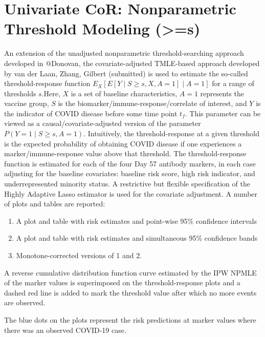 \documentclass[]{article}
\author{}
\date{\vspace{-2.5em}}
\begin{document}
\hypertarget{univariate-cor-nonparametric-threshold-modeling-s}{%
\section{Univariate CoR: Nonparametric Threshold Modeling
(\textgreater{}=s)}\label{univariate-cor-nonparametric-threshold-modeling-s}}

An extension of the unadjusted nonparametric threshold-searching
approach developed in @Donovan, the covariate-adjusted TMLE-based
approach developed by van der Laan, Zhang, Gilbert (submitted) is used
to estimate the so-called threshold-response function
\(E_X[ E[Y \mid S \geq s, X, A = 1] \mid A=1]\) for a range of
thresholds \(s\).Here, \(X\) is a set of baseline characteristics,
\(A=1\) represents the vaccine group, \(S\) is the
biomarker/immune-response/correlate of interest, and \(Y\) is the
indicator of COVID disease before some time point \(t_f\). This
parameter can be viewed as a causal/covariate-adjusted version of the
parameter \(P(Y=1 \mid S \geq s, A=1)\). Intuitively, the
threshold-response at a given threshold is the expected probability of
obtaining COVID disease if one experiences a marker/immune-response
value above that threshold. The threshold-response function is estimated
for each of the four Day 57 antibody markers, in each case adjusting for
the baseline covariates: baseline risk score, high risk indicator, and
underrepresented minority status. A restrictive but flexible
specification of the Highly Adaptive Lasso estimator is used for the
covariate adjustment. A number of plots and tables are reported:

\begin{enumerate}
\item A plot and table with risk estimates and point-wise 95\% confidence intervals
\item A plot and table with risk estimates and simultaneous 95\% confidence bands
\item Monotone-corrected versions of 1 and 2.
\end{enumerate}

A reverse cumulative distribution function curve estimated by the IPW
NPMLE of the marker values is superimposed on the threshold-response
plots and a dashed red line is added to mark the threshold value after
which no more events are observed.

The blue dots on the plots represent the risk predictions at marker
values where there was an observed COVID-19 case.
\end{document}
